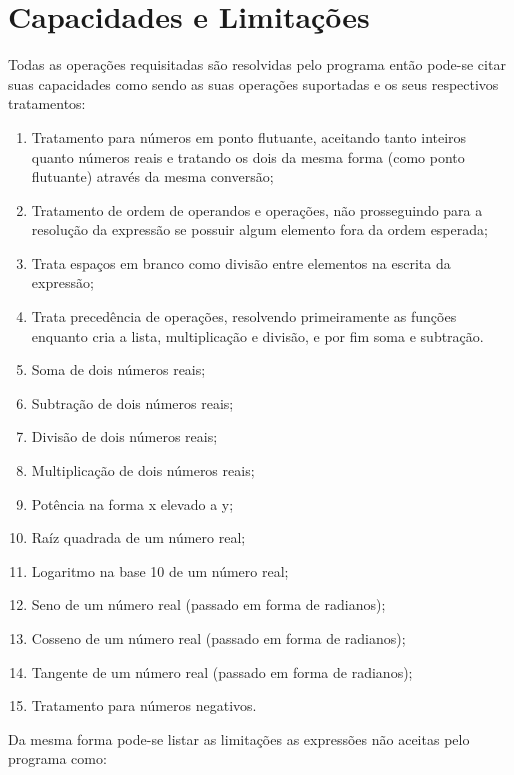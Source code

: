 \documentclass[12pt]{article}
\begin{document}
\section*{Capacidades e Limitações}

Todas as operações requisitadas são resolvidas pelo programa então pode-se citar suas capacidades como sendo as suas operações suportadas e os seus respectivos tratamentos:

\begin{enumerate}
\item Tratamento para números em ponto flutuante, aceitando tanto inteiros quanto números reais e tratando os dois da mesma forma (como ponto flutuante) através da mesma conversão;
\item Tratamento de ordem de operandos e operações, não prosseguindo para a resolução da expressão se possuir algum elemento fora da ordem esperada;
\item Trata espaços em branco como divisão entre elementos na escrita da expressão;
\item Trata precedência de operações, resolvendo primeiramente as funções enquanto cria a lista, multiplicação e divisão, e por fim soma e subtração.
\item Soma de dois números reais;
\item Subtração de dois números reais;
\item Divisão de dois números reais;
\item Multiplicação de dois números reais;
\item Potência na forma x elevado a y;
\item Raíz quadrada de um número real;
\item Logaritmo na base 10 de um número real;
\item Seno de um número real (passado em forma de radianos);
\item Cosseno de um número real (passado em forma de radianos);
\item Tangente de um número real (passado em forma de radianos);
\item Tratamento para números negativos.
\end{enumerate}

Da mesma forma pode-se listar as limitações as expressões não aceitas pelo programa como:
\end{document}
